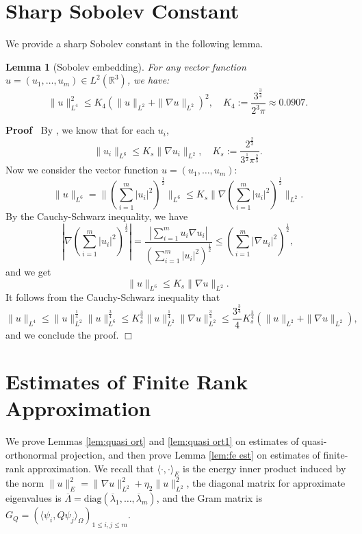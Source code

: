\documentclass[11pt,a4paper]{article}
\numberwithin{equation}{section}
\newcommand{\assign}{:=}
\newenvironment{proof}{\noindent\textbf{Proof\ }}{\hspace*{\fill}$\Box$\medskip}
\newtheorem{lemma}{Lemma}
\begin{document}
\appendix
\section{Sharp Sobolev Constant}
We provide a sharp Sobolev constant in the following lemma.
\begin{lemma}[Sobolev embedding]
  \label{lem:sobolev const}For any vector function $u = (u_1, \ldots, u_m)\in L^2(\mathbb{R}^3)$, we have:
  \begin{equation*}
    \| u \|^2_{L^4} \leqslant K_4 (\| u \|_{L^2} + \| \nabla u \|_{L^2})^2,
  \quad
    K_4 \assign \frac{3^{\frac{3}{4}}}{2^{3} \pi} \approx
    0.0907.
  \end{equation*}
\end{lemma}

\begin{proof}
  By {\cite{talenti1976best}}, we know that for each $u_i$,
  \[ \| u_i \|_{L^6} \leqslant K_s \| \nabla u_i \|_{L^2}, \quad K_s \assign \frac{2^{\frac{2}{3}}}{3^{\frac{1}{2}} \pi^{\frac{2}{3}}} . \]
  Now we consider the vector function $u = (u_1, \ldots, u_m)$:
  \[ \| u \|_{L^6} = \| ( \sum_{i = 1}^m | u_i |^2 )^{\frac{1}{2}}
     \|_{L^6} \leqslant K_s \| \nabla ( \sum_{i = 1}^m | u_i |^2
     )^{\frac{1}{2}} \|_{L^2} . \]
  By the Cauchy-Schwarz inequality, we have 
  \[ | \nabla ( \sum_{i = 1}^m | u_i |^2 )^{\frac{1}{2}}
     | = \frac{| \sum_{i = 1}^m u_i \nabla u_i |}{(
     \sum_{i = 1}^m | u_i |^2 )^{\frac{1}{2}}} \leqslant ( \sum_{i
     = 1}^m | \nabla u_i |^2 )^{\frac{1}{2}}, \]
  and we get
  \[ \| u \|_{L^6} \leqslant K_s \| \nabla u \|_{L^2} . \]
  It follows from the Cauchy-Schwarz inequality that
  \[ \| u \|_{L^4} \leqslant \| u \|^{\frac{1}{4}}_{L^2} \| u \|^{\frac{3}{4}}_{L^6}
     \leqslant K_s^{\frac{3}{4}} \| u \|^{\frac{1}{4}}_{L^2} \| \nabla u
     \|^{\frac{3}{4}}_{L^2} \leqslant \frac{3^{\frac{3}{4}}}{4} K_s^{\frac{3}{4}} (\| u \|_{L^2} + \| \nabla u \|_{L^2}), \]
  and we conclude the proof.
\end{proof}

\section{Estimates of Finite Rank Approximation}
\label{appen:lem1}
We prove Lemmas \ref{lem:quasi ort} and \ref{lem:quasi ort1} on estimates of quasi-orthonormal projection, and then prove Lemma \ref{lem:fe est} on estimates of finite-rank approximation. We recall that $\langle\cdot,\cdot\rangle_E$ is the energy inner product induced by the norm  $\|u\|_E^2=\|\nabla u\|_{L^2}^2+\eta_2\|u\|_{L^2}^2$, the diagonal matrix for approximate eigenvalues is $\overline\Lambda=\mathrm{diag}(\overline\lambda_1,\dots,\overline\lambda_m)$, and the Gram matrix is $G_Q=(\langle \psi_i,Q\psi_j\rangle_\Omega)_{1\leqslant i,j\leqslant m}$.
\end{document}
